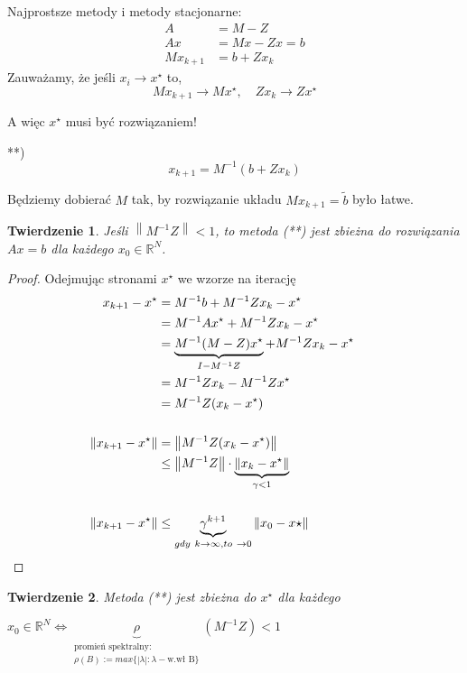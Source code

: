 \documentclass[hidelinks,a4paper,fleqn,oneside]{book}
\newcommand{\RR}{\mathbb{R}}
\newcommand{\ra}{\rightarrow}
\newcommand{\eye}{I}
\newcommand{\norm}[1]{\left\lVert#1\right\rVert}
\newtheorem{twierdz}{Twierdzenie}
\begin{document}
Najprostsze metody i metody stacjonarne:
\begin{align*}
	A & = M - Z \\
	Ax & = Mx - Zx = b\\
	Mx_{k+1} & = b + Zx_k 
\end{align*}
Zauważamy, że jeśli $x_i \ra x^\star$ to,
\[
	Mx_{k+1} \ra Mx^\star,\quad Zx_k \ra Zx^\star
\]

A więc $x^\star$ musi być rozwiązaniem!

**)
\[
	x_{k+1} = M^{-1}(b + Zx_k)
\]

Będziemy dobierać $M$ tak, by rozwiązanie układu $Mx_{k+1} = \tilde{b}$ było łatwe.

\begin{twierdz}
	Jeśli $\norm{M^{-1}Z} < 1$, to metoda (**) jest zbieżna do rozwiązania $Ax = b$ dla każdego $x_0 \in \RR^N$.
\end{twierdz}


\begin{proof}
  Odejmując stronami $x^\star$ we wzorze na iterację
  \begin{align*}
	x_{k+1} - x^\star & = M^{-1}b + M^{-1}Zx_k - x^\star \\
		& = M^{-1}Ax^\star + M^{-1}Zx_k - x^\star \\
		& = \underbrace{M^{-1}(M-Z)x^\star}_{\eye - M^{-1}Z} + M^{-1}Zx_k - x^\star \\
		& = M^{-1}Zx_k - M^{-1}Zx^\star\\
		& = M^{-1}Z(x_k - x^\star) \\ \\
		\norm{x_{k+1} - x^\star} & = \norm{M^{-1}Z(x_k - x^\star)} \\
		& \leq \norm{M^{-1}Z} \cdot \underbrace{\norm{x_k - x^\star}}_{\gamma < 1} \\ \\
		\norm{x_{k+1} - x^\star} & \leq \underbrace{\gamma^{k+1}}_{gdy\ k \ra \infty, to\ \ra 0} \norm{x_0 - x\star}
		 && \qedhere
  \end{align*}
\end{proof}
	
\begin{twierdz}
	Metoda (**) jest zbieżna do $x^\star$ dla każdego

    $x_0 \in \RR^N \iff \underbrace{\rho}_{\substack{\textrm{promień spektralny: }\\ \rho(B) := max\{| \lambda|: \lambda - \textrm{w.wł B}\}}}(M^{-1}Z) < 1$
\end{twierdz}
\end{document}
